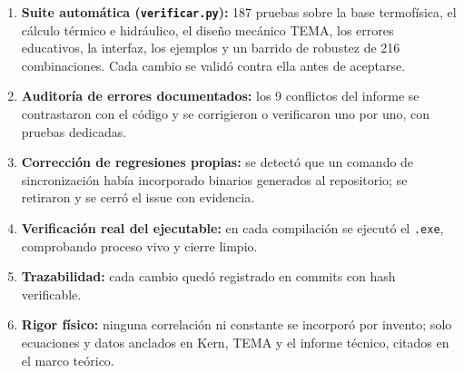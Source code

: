 \documentclass[11pt,a4paper]{article}
\begin{document}
\begin{enumerate}
\item \textbf{Suite autom\'atica (\texttt{verificar.py}):} 187 pruebas sobre
la base termof\'isica, el c\'alculo t\'ermico e hidr\'aulico, el dise\~no
mec\'anico TEMA, los errores educativos, la interfaz, los ejemplos y un
barrido de robustez de 216 combinaciones. Cada cambio se valid\'o contra
ella antes de aceptarse.
\item \textbf{Auditor\'ia de errores documentados:} los 9 conflictos del
informe se contrastaron con el c\'odigo y se corrigieron o verificaron uno
por uno, con pruebas dedicadas.
\item \textbf{Correcci\'on de regresiones propias:} se detect\'o que un
comando de sincronizaci\'on hab\'ia incorporado binarios generados al
repositorio; se retiraron y se cerr\'o el issue con evidencia.
\item \textbf{Verificaci\'on real del ejecutable:} en cada compilaci\'on se
ejecut\'o el \texttt{.exe}, comprobando proceso vivo y cierre limpio.
\item \textbf{Trazabilidad:} cada cambio qued\'o registrado en commits con
hash verificable.
\item \textbf{Rigor f\'isico:} ninguna correlaci\'on ni constante se
incorpor\'o por invento; solo ecuaciones y datos anclados en Kern, TEMA y el
informe t\'ecnico, citados en el marco te\'orico.
\end{enumerate}
\end{document}

